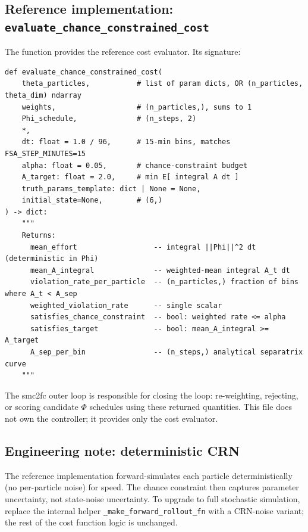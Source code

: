 \documentclass[11pt,a4paper]{article}
\theoremstyle{definition}
\begin{document}
\subsection{Reference implementation: \texttt{evaluate\_chance\_constrained\_cost}}

The function 
provides the reference cost evaluator. Its signature:

\begin{lstlisting}
def evaluate_chance_constrained_cost(
    theta_particles,           # list of param dicts, OR (n_particles, theta_dim) ndarray
    weights,                   # (n_particles,), sums to 1
    Phi_schedule,              # (n_steps, 2)
    *,
    dt: float = 1.0 / 96,      # 15-min bins, matches FSA_STEP_MINUTES=15
    alpha: float = 0.05,       # chance-constraint budget
    A_target: float = 2.0,     # min E[ integral A dt ]
    truth_params_template: dict | None = None,
    initial_state=None,        # (6,)
) -> dict:
    """
    Returns:
      mean_effort                  -- integral ||Phi||^2 dt  (deterministic in Phi)
      mean_A_integral              -- weighted-mean integral A_t dt
      violation_rate_per_particle  -- (n_particles,) fraction of bins where A_t < A_sep
      weighted_violation_rate      -- single scalar
      satisfies_chance_constraint  -- bool: weighted rate <= alpha
      satisfies_target             -- bool: mean_A_integral >= A_target
      A_sep_per_bin                -- (n_steps,) analytical separatrix curve
    """
\end{lstlisting}

The smc2fc outer loop is responsible for closing the loop:
re-weighting, rejecting, or scoring candidate $\Phi$ schedules using
these returned quantities. This file does not own the controller; it
provides only the cost evaluator.

\subsection{Engineering note: deterministic CRN}

The reference implementation forward-simulates each particle
deterministically (no per-particle noise) for speed. The chance
constraint then captures parameter uncertainty, not state-noise
uncertainty. To upgrade to full stochastic simulation, replace the
internal helper \texttt{\_make\_forward\_rollout\_fn} with a CRN-noise
variant; the rest of the cost function logic is unchanged.
\end{document}

